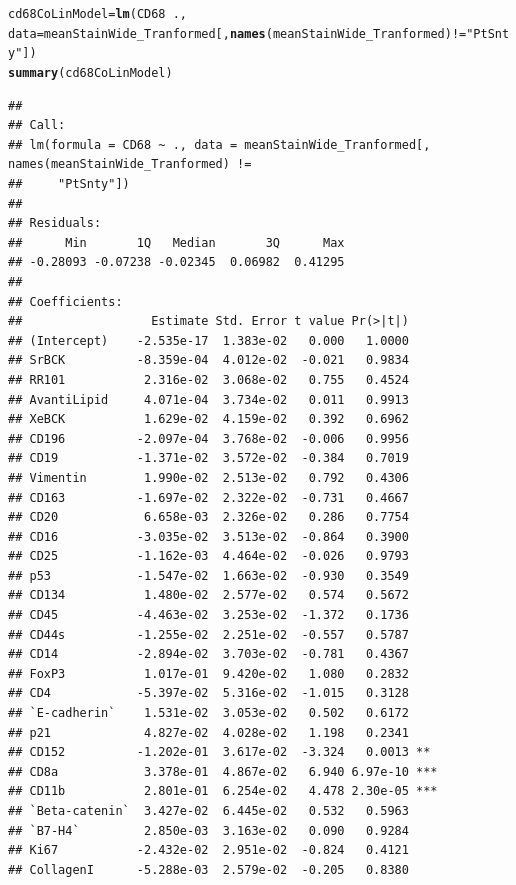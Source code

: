 \documentclass[a4paper]{article}\usepackage[]{graphicx}\usepackage[]{color}
\makeatletter
\newcommand{\hlstr}[1]{\textcolor[rgb]{0.192,0.494,0.8}{#1}}%
\newcommand{\hlopt}[1]{\textcolor[rgb]{0,0,0}{#1}}%
\newcommand{\hlstd}[1]{\textcolor[rgb]{0.345,0.345,0.345}{#1}}%
\newcommand{\hlkwb}[1]{\textcolor[rgb]{0.69,0.353,0.396}{#1}}%
\newcommand{\hlkwc}[1]{\textcolor[rgb]{0.333,0.667,0.333}{#1}}%
\newcommand{\hlkwd}[1]{\textcolor[rgb]{0.737,0.353,0.396}{\textbf{#1}}}%
\newenvironment{kframe}{%
 \def\at@end@of@kframe{}%
 \ifinner\ifhmode%
  \def\at@end@of@kframe{\end{minipage}}%
  \begin{minipage}{\columnwidth}%
 \fi\fi%
 \def\FrameCommand##1{\hskip\@totalleftmargin \hskip-\fboxsep
 \colorbox{shadecolor}{##1}\hskip-\fboxsep
     \hskip-\linewidth \hskip-\@totalleftmargin \hskip\columnwidth}%
 \MakeFramed {\advance\hsize-\width
   \@totalleftmargin\z@ \linewidth\hsize
   \@setminipage}}%
 {\par\unskip\endMakeFramed%
 \at@end@of@kframe}
\newenvironment{knitrout}{}{} %
\makeatother
\begin{document}
\begin{knitrout}
\color{fgcolor}\begin{kframe}
\begin{alltt}
\hlstd{cd68CoLinModel} \hlkwb{=} \hlkwd{lm}\hlstd{(CD68}\hlopt{~}\hlstd{.,}
                    \hlkwc{data}\hlstd{=meanStainWide_Tranformed[,}\hlkwd{names}\hlstd{(meanStainWide_Tranformed)}\hlopt{!=}\hlstr{"PtSnty"}\hlstd{])}
\hlkwd{summary}\hlstd{(cd68CoLinModel)}
\end{alltt}
\begin{verbatim}
## 
## Call:
## lm(formula = CD68 ~ ., data = meanStainWide_Tranformed[, names(meanStainWide_Tranformed) != 
##     "PtSnty"])
## 
## Residuals:
##      Min       1Q   Median       3Q      Max 
## -0.28093 -0.07238 -0.02345  0.06982  0.41295 
## 
## Coefficients:
##                  Estimate Std. Error t value Pr(>|t|)    
## (Intercept)    -2.535e-17  1.383e-02   0.000   1.0000    
## SrBCK          -8.359e-04  4.012e-02  -0.021   0.9834    
## RR101           2.316e-02  3.068e-02   0.755   0.4524    
## AvantiLipid     4.071e-04  3.734e-02   0.011   0.9913    
## XeBCK           1.629e-02  4.159e-02   0.392   0.6962    
## CD196          -2.097e-04  3.768e-02  -0.006   0.9956    
## CD19           -1.371e-02  3.572e-02  -0.384   0.7019    
## Vimentin        1.990e-02  2.513e-02   0.792   0.4306    
## CD163          -1.697e-02  2.322e-02  -0.731   0.4667    
## CD20            6.658e-03  2.326e-02   0.286   0.7754    
## CD16           -3.035e-02  3.513e-02  -0.864   0.3900    
## CD25           -1.162e-03  4.464e-02  -0.026   0.9793    
## p53            -1.547e-02  1.663e-02  -0.930   0.3549    
## CD134           1.480e-02  2.577e-02   0.574   0.5672    
## CD45           -4.463e-02  3.253e-02  -1.372   0.1736    
## CD44s          -1.255e-02  2.251e-02  -0.557   0.5787    
## CD14           -2.894e-02  3.703e-02  -0.781   0.4367    
## FoxP3           1.017e-01  9.420e-02   1.080   0.2832    
## CD4            -5.397e-02  5.316e-02  -1.015   0.3128    
## `E-cadherin`    1.531e-02  3.053e-02   0.502   0.6172    
## p21             4.827e-02  4.028e-02   1.198   0.2341    
## CD152          -1.202e-01  3.617e-02  -3.324   0.0013 ** 
## CD8a            3.378e-01  4.867e-02   6.940 6.97e-10 ***
## CD11b           2.801e-01  6.254e-02   4.478 2.30e-05 ***
## `Beta-catenin`  3.427e-02  6.445e-02   0.532   0.5963    
## `B7-H4`         2.850e-03  3.163e-02   0.090   0.9284    
## Ki67           -2.432e-02  2.951e-02  -0.824   0.4121    
## CollagenI      -5.288e-03  2.579e-02  -0.205   0.8380    

\end{verbatim}
\end{kframe}
\end{knitrout}
\end{document}
